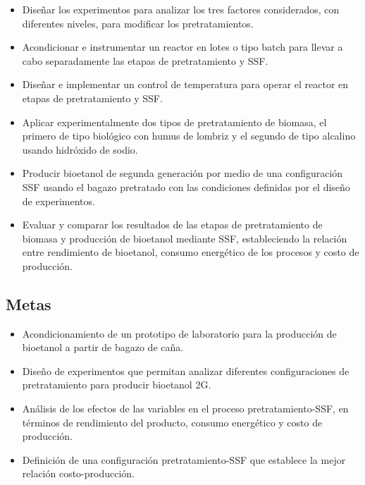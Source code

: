 \documentclass[12pt]{article}
\begin{document}
	\begin{itemize}
		\item Diseñar los experimentos para analizar los tres factores considerados, con diferentes niveles, para modificar los pretratamientos.
		\item Acondicionar e instrumentar un reactor en lotes o tipo batch para llevar a cabo separadamente las etapas de pretratamiento y SSF.
		\item Diseñar e implementar un control de temperatura para operar el reactor en etapas de pretratamiento y SSF.
		\item Aplicar experimentalmente dos tipos de pretratamiento de biomasa, el primero de tipo biológico con humus de lombriz y el segundo de tipo alcalino usando hidróxido de sodio.
		\item Producir bioetanol de segunda generación por medio de una configuración SSF usando el bagazo pretratado con las condiciones definidas por el diseño de experimentos.
		\item Evaluar y comparar los resultados de las etapas de pretratamiento de biomasa y producción de bioetanol mediante SSF, estableciendo la relación entre rendimiento de bioetanol, consumo energético de los procesos y costo de producción.		


	\end{itemize}
	
	\subsection{Metas}
	
	\begin{itemize}



		\item 
		Acondicionamiento de un prototipo de laboratorio para la producción de bioetanol a partir de bagazo de caña.
		
		\item 
		Diseño de experimentos que permitan analizar diferentes configuraciones de pretratamiento para producir bioetanol 2G. 
		
		
		\item 
		Análisis de los efectos de las variables en el proceso pretratamiento-SSF, en términos de rendimiento del producto, consumo energético y costo de producción.
		
	   \item Definición de una configuración pretratamiento-SSF que establece la mejor relación costo-producción.
		
	\end{itemize}
	\newpage
	
\end{document}
